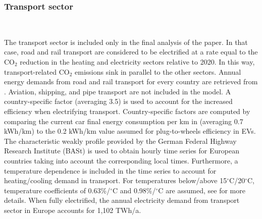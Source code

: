 \documentclass[3p]{elsarticle} %
\begin{document}

\FloatBarrier

\subsubsection{Transport sector} \label{sec_transport}\

The transport sector is included only in the final analysis of the paper. In that case, road and rail transport are considered to be electrified at a rate equal to the CO$_2$ reduction in the heating and electricity sectors relative to 2020. In this way, transport-related CO$_2$ emissions sink in parallel to the other sectors. Annual energy demands from road and rail transport for every country are retrieved from \cite{ODYSSEE}. Aviation, shipping, and pipe transport are not included in the model.  A country-specific factor (averaging 3.5) is used to account for the increased efficiency when electrifying transport. Country-specific factors are computed by comparing the current car final energy consumption per km in \cite{ODYSSEE} (averaging 0.7 kWh/km) to the 0.2 kWh/km value assumed for plug-to-wheels efficiency in EVs. The characteristic weakly profile provided by the German Federal Highway Research Institute (BASt) \cite{BASt} is used to obtain hourly time series for European countries taking into account the corresponding local times. Furthermore, a temperature dependence is included in the time series to account for heating/cooling demand in transport. For temperatures below/above 15$^{\circ}$C/20$^{\circ}$C, temperature coefficients of 0.63\%/$^{\circ}$C and 0.98\%/$^{\circ}$C are assumed, see \cite{Brown_2018} for more details. When fully electrified, the annual electricity demand from transport sector in Europe accounts for 1,102 TWh/a. 
\end{document}
